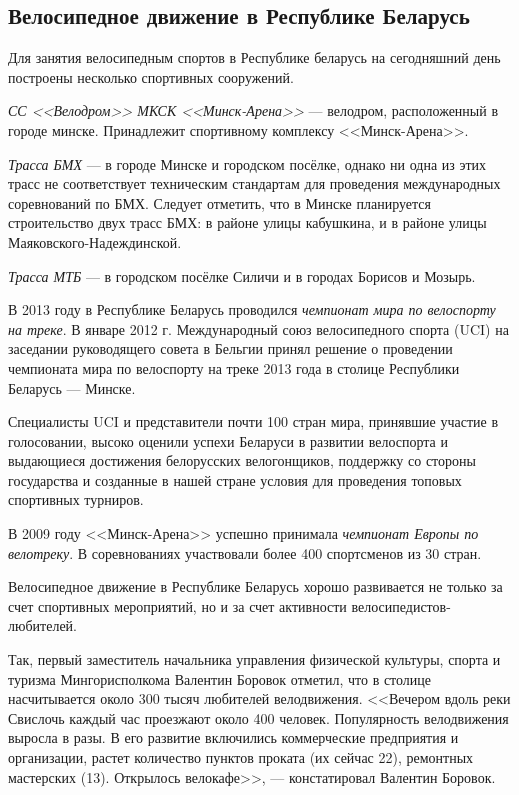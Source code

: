 \subsection{Велосипедное движение в Республике Беларусь}

Для занятия велосипедным спортов в Республике беларусь на сегодняшний день построены
несколько спортивных сооружений.

\textit{СС <<Велодром>> МКСК <<Минск-Арена>>} --- велодром, расположенный в городе минске.
Принадлежит спортивному комплексу <<Минск-Арена>>.

\textit{Трасса БМХ} --- в городе Минске и городском посёлке, однако ни одна из этих
трасс не соответствует техническим стандартам для проведения международных соревнований
по БМХ. Следует отметить, что в Минске планируется строительство двух трасс БМХ:
в районе улицы кабушкина, и в районе улицы Маяковского-Надеждинской.

\textit{Трасса МТБ} --- в городском посёлке Силичи и в городах Борисов и Мозырь. 

В 2013 году в Республике Беларусь проводился \textit{чемпионат мира
по велоспорту на треке}. В январе 2012 г. Международный союз велосипедного спорта (UCI)
на заседании руководящего совета в Бельгии принял решение о проведении
чемпионата мира по велоспорту на треке 2013 года в столице Республики Беларусь --- Минске.

Специалисты UCI и представители почти 100 стран мира,
принявшие участие в голосовании, высоко оценили успехи Беларуси
в развитии велоспорта и выдающиеся достижения белорусских велогонщиков,
поддержку со стороны государства и созданные в нашей стране условия
для проведения топовых спортивных турниров.

В 2009 году <<Минск-Арена>>
успешно принимала \textit{чемпионат Европы по велотреку}. В соревнованиях
участвовали более 400 спортсменов из 30 стран\cite{velo_world_cup}.

Велосипедное движение в Республике Беларусь хорошо развивается
не только за счет спортивных мероприятий, но и за счет активности велосипедистов-любителей.

Так, первый заместитель начальника управления физической культуры, спорта и туризма
Мингорисполкома Валентин Боровок отметил, что в столице насчитывается около
300 тысяч любителей велодвижения. <<Вечером вдоль реки Свислочь каждый час
проезжают около 400 человек. Популярность велодвижения выросла в разы.
В его развитие включились коммерческие предприятия и организации,
растет количество пунктов проката (их сейчас 22), ремонтных мастерских (13).
Открылось велокафе>>, --- констатировал Валентин Боровок\cite{velo_infrastructure}.

